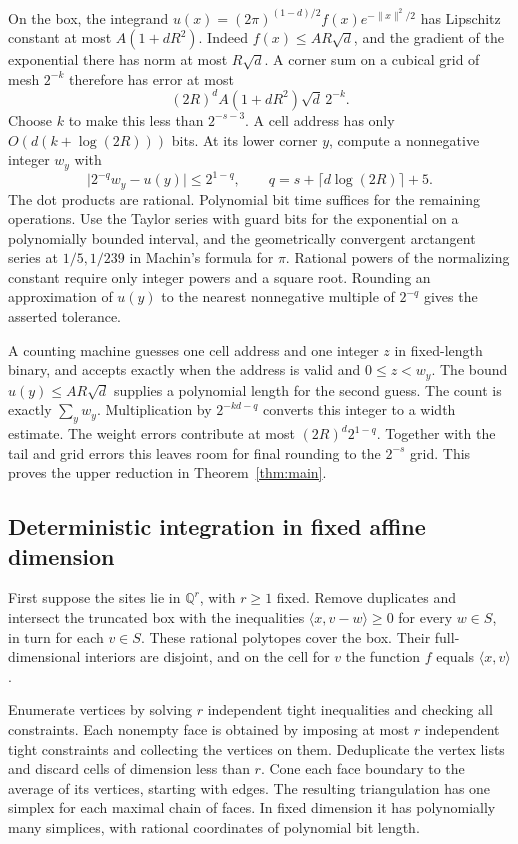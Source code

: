 \documentclass[11pt,letterpaper]{article}
\theoremstyle{definition}
\newcommand{\Q}{\mathbb Q}
\newcommand{\norm}[1]{\lVert#1\rVert}
\newcommand{\ip}[2]{\langle #1,#2\rangle}
\begin{document}
On the box, the integrand
\(u(x)=(2\pi)^{(1-d)/2}f(x)e^{-\norm x^2/2}\) has Lipschitz constant
at most \(A(1+dR^2)\). Indeed \(f(x)\le AR\sqrt d\), and the gradient of
the exponential there has norm at most \(R\sqrt d\). A corner sum on a
cubical grid of mesh \(2^{-k}\) therefore has error at most
\[
 (2R)^d A(1+dR^2)\sqrt d\,2^{-k}.
\]
Choose \(k\) to make this less than \(2^{-s-3}\). A cell address has only
\(O(d(k+\log(2R)))\) bits. At its lower corner \(y\), compute a
nonnegative integer \(w_y\) with
\[
 \big|2^{-q}w_y-u(y)\big|\le 2^{1-q},
 \qquad q=s+\lceil d\log(2R)\rceil+5 .
\]
The dot products are rational. Polynomial bit time suffices for the
remaining operations. Use the Taylor series with guard bits for the
exponential on a polynomially bounded interval, and the geometrically
convergent arctangent series at \(1/5,1/239\) in Machin's formula for
\(\pi\). Rational powers of the normalizing constant require only integer
powers and a square root. Rounding an approximation of \(u(y)\) to the
nearest nonnegative multiple of \(2^{-q}\) gives the asserted tolerance.

A counting machine guesses one cell address and one integer \(z\) in
fixed-length binary, and accepts exactly when the address is valid and
\(0\le z<w_y\). The bound \(u(y)\le AR\sqrt d\) supplies a polynomial
length for the second guess. The count is exactly \(\sum_y w_y\).
Multiplication by \(2^{-kd-q}\) converts this integer to a width estimate.
The weight errors contribute at most \((2R)^d 2^{1-q}\). Together with
the tail and grid errors this leaves room for final rounding to the
\(2^{-s}\) grid. This proves the upper reduction in Theorem~\ref{thm:main}.

\subsection{Deterministic integration in fixed affine dimension}
First suppose the sites lie in \(\Q^r\), with \(r\ge1\) fixed. Remove
duplicates and intersect the truncated box with the inequalities
\(\ip{x}{v-w}\ge0\) for every \(w\in S\), in turn for each \(v\in S\).
These rational polytopes cover the box. Their full-dimensional interiors
are disjoint, and on the cell for \(v\) the function \(f\) equals \(\ip{x}{v}\).

Enumerate vertices by solving \(r\) independent tight inequalities and
checking all constraints. Each nonempty face is obtained by imposing at most
\(r\) independent tight constraints and collecting the vertices on them.
Deduplicate the vertex lists and discard cells of dimension less than
\(r\). Cone each face boundary to the average of its vertices, starting
with edges. The resulting triangulation has one simplex for each maximal
chain of faces. In fixed dimension it has polynomially many simplices,
with rational coordinates of polynomial bit length.
\end{document}
